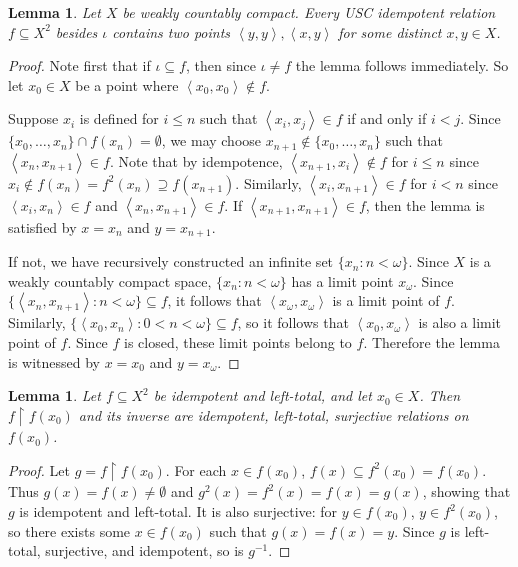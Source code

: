 \documentclass{article}
\newcommand{\tuple}[1]{\left\langle{#1}\right\rangle}
\newcommand{\rest}{\upharpoonright}
\theoremstyle{plain}
\newtheorem{lemma}[theorem]{Lemma}
\theoremstyle{definition}
\theoremstyle{remark}
\begin{document}
\begin{lemma}\label{lemma-usc-idempotent}
  Let \(X\) be weakly countably compact.
  Every USC idempotent relation \(f\subseteq X^2\) besides \(\iota\)
  contains two points \(\tuple{y,y},\tuple{x,y}\) for some 
  distinct \(x,y\in X\).
\end{lemma}
\begin{proof}
  Note first that if \(\iota\subseteq f\), then since
  \(\iota\not=f\) the lemma follows
  immediately. So 
  let \(x_0\in X\) be a point where \(\tuple{x_0,x_0}\not\in f\).
  
  Suppose \(x_i\) is defined for \(i\leq n\) such that
  \(\tuple{x_i,x_j}\in f\) if and only if \(i<j\).
  Since \(\{x_0,\dots,x_n\}\cap f(x_n)=\emptyset\),
  we may choose \(x_{n+1}\not\in\{x_0,\dots,x_n\}\)
  such that \(\tuple{x_n,x_{n+1}}\in f\).
  Note that by idempotence, \(\tuple{x_{n+1},x_i}\not\in f\)
  for \(i\leq n\) since 
  \(x_i\not\in f(x_n)=f^2(x_n)\supseteq f(x_{n+1})\).
  Similarly, \(\tuple{x_i,x_{n+1}}\in f\) for \(i<n\) since
  \(\tuple{x_i,x_n}\in f\) and \(\tuple{x_n,x_{n+1}}\in f\).
  If \(\tuple{x_{n+1},x_{n+1}}\in f\),
  then the lemma is satisfied by \(x=x_n\) and \(y=x_{n+1}\).
  
  If not, we have recursively constructed an infinite
  set \(\{x_n:n<\omega\}\).
  Since \(X\) is a weakly countably compact space, 
  \(\{x_n:n<\omega\}\) has a limit point \(x_\omega\).
  Since \(\{\tuple{x_n,x_{n+1}}:n<\omega\}\subseteq f\), it follows that
  \(\tuple{x_\omega,x_\omega}\) is a limit point of \(f\).
  Similarly, \(\{\tuple{x_0,x_n}:0<n<\omega\}\subseteq f\),
  so it follows that \(\tuple{x_0,x_\omega}\)
  is also a limit point of \(f\). Since \(f\) is closed,
  these limit points belong to \(f\).
  Therefore the lemma is witnessed by
  \(x=x_0\) and \(y=x_\omega\).
\end{proof}

\begin{lemma}
  Let \(f\subseteq X^2\) be idempotent and left-total, and let \(x_0\in X\).
  Then \(f\rest f(x_0)\) and its inverse are idempotent, left-total,
  surjective relations on \(f(x_0)\).
\end{lemma}
\begin{proof}
  Let \(g=f\rest f(x_0)\). For each \(x\in f(x_0)\), \(f(x)\subseteq f^2(x_0)=f(x_0)\).
  Thus \(g(x)=f(x)\not=\emptyset\) and 
  \(g^2(x)=f^2(x)=f(x)=g(x)\), showing that \(g\) is idempotent and left-total.
  It is also surjective: for \(y\in f(x_0)\), \(y\in f^2(x_0)\), so there
  exists some \(x\in f(x_0)\) such that \(g(x)=f(x)=y\).
  Since \(g\) is left-total, surjective, and idempotent, so is \(g^{-1}\).
\end{proof}
\end{document}
